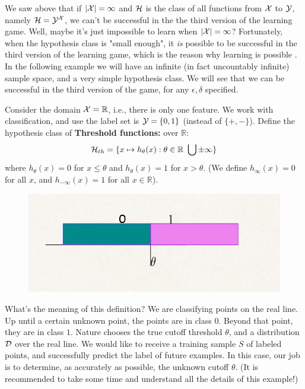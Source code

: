 {We saw above that if $|\mathcal{X}|=\infty$ and $\mathcal{H}$ is the class of all functions from
$\mathcal{X}$ to $\mathcal{Y}$, namely $\mathcal{H}=\mathcal{Y} ^{\mathcal{X}}$, we can't be successful in the  the third version of the learning game. 
Well, maybe it's just impossible to learn when $|\mathcal{X}|=\infty$?  Fortunately, when the hypothesis class is "small enough", it \textit{is} possible to be successful in the third version of the learning game, which is the reason why learning is possible . In the following example we will have an infinite (in fact uncountably infinite) sample space, and a very simple hypothesis class. We will see that we can be successful in the third version of the game, for any $\epsilon,\delta$ specified. 

Consider the domain $\mathcal{X}=\mathbb{R}$, i.e., there is only one feature. We work with classification, and use the label set is $\mathcal{Y}=\{0,1\}$ (instead of $\{+,-\}$).
Define the hypothesis class of \textbf{Threshold functions:}  over $\mathbb{R}$:
$$\mathcal{H}_{th} = \{ x \mapsto h_{\theta}(x) : \theta \in \mathbb{R} \ \bigcup \pm\infty\}$$
where $ h_{\theta}(x)=0$ for $x\leq \theta$ and $ h_{\theta}(x)=1$ for $x> \theta$. (We define $h_{\infty}(x)=0$ for all $x$, and $h_{-\infty}(x)=1$ for all $x\in\mathbb{R}$).

\begin{figure}[h!]
	\centering
	\includegraphics[scale=0.3]{chapters/pac/figures/threshold.png}
\end{figure}
\vspace{5mm}

What's the meaning of this definition? We are classifying points on the real line. Up until a certain unknown point, the points are in class $0$. Beyond that point, they are in class $1$. Nature chooses the true cutoff threshold $\theta$, and a distribution $\mathcal{D}$ over the real line.  We would like to receive a training sample $S$ of labeled points, and successfully predict the label of future examples. In this case, our job is to determine, as accurately as possible, the unknown cutoff $\theta$. (It is recommended to take some time and understand all the details of this example!) 

}
